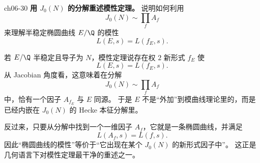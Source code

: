 \begin{problem}{ch06-30}
\textbf{用 $J_0(N)$ 的分解重述模性定理。}
说明如何利用
\[
J_0(N)\sim \prod_f A_f
\]
来理解半稳定椭圆曲线 $E/\Q$ 的模性
\[
L(E,s)=L(f_E,s).
\]
\end{problem}
\begin{solution}
若 $E/\Q$ 半稳定且导子为 $N$，模性定理说存在权 $2$ 新形式 $f_E$ 使
\[
L(E,s)=L(f_E,s).
\]
从 Jacobian 角度看，这意味着在分解
\[
J_0(N)\sim \prod_f A_f
\]
中，恰有一个因子 $A_{f_E}$ 与 $E$ 同源。
于是 $E$ 不是“外加”到模曲线理论里的，而是已经内嵌在 $J_0(N)$ 的 Hecke 本征分解里。

反过来，只要从分解中找到一个一维因子 $A_f$，它就是一条椭圆曲线，并满足
\[
L(A_f,s)=L(f,s).
\]
因此“椭圆曲线的模性”等价于“它出现在某个 $J_0(N)$ 的新形式因子中”。
这正是几何语言下对模性定理最干净的重述之一。
\end{solution}
